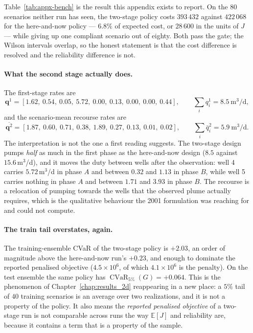 \documentclass[11pt]{article}
\newcommand{\E}{\mathbb{E}}
\newcommand{\qq}{\mathbf{q}}
\newcommand{\CVaR}{\operatorname{CVaR}}
\begin{document}
Table~\ref{tab:appx-bench} is the result this appendix exists to report. On the
$80$ scenarios neither run has seen, the two-stage policy costs
$393\,432$ against $422\,068$ for the here-and-now policy --- $6.8\%$ of expected
cost, or $28\,600$ in the units of $J$ --- while giving up one compliant scenario
out of eighty. Both pass the gate; the Wilson intervals overlap, so the honest
statement is that the cost difference is resolved and the reliability difference
is not.

\paragraph{What the second stage actually does.} The first-stage rates are
\[
\qq^{1}=[1.62,\ 0.54,\ 0.05,\ 5.72,\ 0.00,\ 0.13,\ 0.00,\ 0.00,\ 0.44],
\qquad \textstyle\sum_i q^1_i=8.5\ \mathrm{m^3/d},
\]
and the scenario-mean recourse rates are
\[
\overline{\qq^{2}}=[1.87,\ 0.60,\ 0.71,\ 0.38,\ 1.89,\ 0.27,\ 0.13,\ 0.01,\ 0.02],
\qquad \textstyle\sum_i \bar q^2_i=5.9\ \mathrm{m^3/d}.
\]
The interpretation is not the one a first reading suggests. The two-stage design
pumps \emph{half} as much in the first phase as the here-and-now design
($8.5$ against $15.6$\,m$^3$/d), and it moves the duty between wells after the
observation: well 4 carries $5.72$\,m$^3$/d in phase $A$ and between $0.32$ and
$1.13$ in phase $B$, while well 5 carries nothing in phase $A$ and between
$1.71$ and $3.93$ in phase $B$. The recourse is a relocation of pumping towards
the wells that the observed plume actually requires, which is the qualitative
behaviour the 2001 formulation was reaching for and could not compute.

\paragraph{The train tail overstates, again.} The training-ensemble CVaR of the
two-stage policy is $+2.03$, an order of magnitude above the here-and-now run's
$+0.23$, and enough to dominate the reported penalised objective
($4.5\times10^6$, of which $4.1\times10^6$ is the penalty). On the test ensemble
the same policy has $\CVaR_{5\%}(G)=+0.064$. This is the phenomenon of
Chapter~\ref{chap:results_2d} reappearing in a new place: a $5\%$ tail of $40$
training scenarios is an average over two realizations, and it is not a property
of the policy. It also means the \emph{reported penalised objective} of a
two-stage run is not comparable across runs the way $\E[J]$ and reliability are,
because it contains a term that is a property of the sample.
\end{document}
